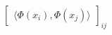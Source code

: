 \documentclass[preview]{standalone}
\begin{document}
\begin{align*}
\begin{bmatrix}\langle \Phi(x_i) , \Phi(x_j)\rangle\end{bmatrix}_{ij   }
\end{align*}
\end{document}
